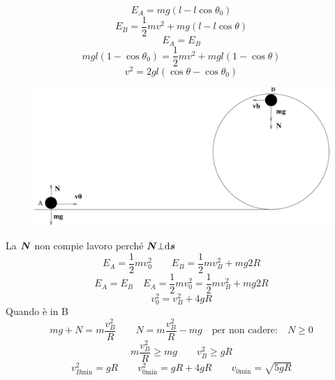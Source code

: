 \begin{equation*}E_A=mg\left(l-l\cos\theta_0\right)\end{equation*}
\begin{equation*}E_B=\frac{1}{2}mv^2+mg\left(l-l\cos\theta\right)\end{equation*}
\begin{equation*}E_A=E_B\end{equation*}
\begin{equation*}mgl\left(1-\cos\theta_0\right)=\frac{1}{2}mv^2+mgl\left(1-\cos\theta\right)\end{equation*}
\begin{equation*}v^2=2gl(\cos\theta-\cos\theta_0)\end{equation*}

\begin{Es}
\begin{figure}[htbp]
\centering
\includegraphics[scale=0.4]{immagini/fisica1/arriva_in_alto}
\end{figure}
La $\boldsymbol{N}$ non compie lavoro perché $\boldsymbol{N}\bot \mathrm{d}\boldsymbol{s}$
\begin{equation*}E_A=\frac{1}{2}mv_0^2 \qquad E_B=\frac{1}{2}mv_B^2+mg2R\end{equation*}
\begin{equation*}E_A=E_B \quad E_A=\frac{1}{2}mv_0^2=\frac{1}{2}mv_B^2+mg2R\end{equation*}
\begin{equation*}v_0^2=v_B^2+4gR\end{equation*}
Quando è in B
\begin{equation*}mg+N=m\frac{v_B^2}{R}\qquad N=m\frac{v_B^2}{R}-mg\quad \text{per non cadere:}\quad N\geq0\end{equation*}
\begin{equation*}m\frac{v_B^2}{R}\geq mg\qquad v_B^2\geq gR\end{equation*}
\begin{equation*}v_{B\text{min}}^2=gR\qquad v_{0\text{min}}^2=gR+4gR\qquad v_{0\text{min}}=\sqrt{5gR}\end{equation*}
\end{Es}

